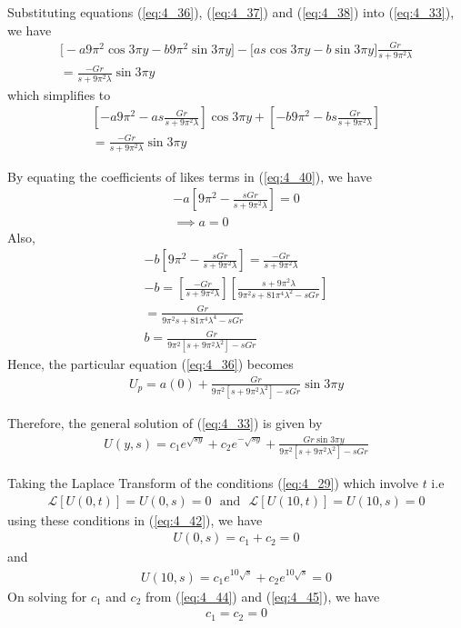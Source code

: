 \documentclass[11pt]{report}
\newcommand{\sps}{\\[0.2cm]}
\newcommand{\refn}[1]{(\ref{#1})}
\newcommand{\refx}[1]{\refn{eq:#1}}
\newcommand{\NI}{\noindent}
\newcommand{\Laplace}{\mathcal{L}}
\newcommand{\sbracket}[1]{\left[#1\right]}
\newcommand{\LFn}[1]{\Laplace \sbracket{#1}}
\newcommand{\Lpt}{Laplace Transform }
\begin{document}
	\NI Substituting equations \refx{4_36}, \refx{4_37} and \refx{4_38} into \refx{4_33}, we have
	\begin{multline}
		\Big[ -a9\pi^2\cos3\pi y - b9\pi^2\sin 3\pi y \Big] - \Big[ as\cos 3\pi y - b\sin 3\pi y \Big]\frac{Gr}{s+9\pi^2 \lambda} \sps= \frac{-Gr}{s+9\pi^2\lambda}\sin 3\pi y
	\end{multline}
	which simplifies to
	\begin{multline}
		\left[-a9\pi^2 - as\frac{Gr}{s+9\pi^2\lambda}\right]\cos3\pi y + \left[-b9\pi^2 - bs\frac{Gr}{s+9\pi^2\lambda}\right] \sps= \frac{-Gr}{s+9\pi^2\lambda}\sin3\pi y\label{eq:4_40}
	\end{multline}

	\NI By equating the coefficients of likes terms in \refx{4_40}, we have
	\begin{gather*}
		-a\left[9\pi^2 - \frac{sGr}{s+9\pi^2\lambda}\right] = 0\sps
		\implies a = 0
	\end{gather*}
	Also,
	\begin{gather*}
		-b\left[9\pi^2 - \frac{sGr}{s+ 9\pi^2\lambda}\right] = \frac{-Gr}{s+9\pi^2\lambda}\sps
		-b = \left[\frac{-Gr}{s+ 9\pi^2\lambda}\right]\left[\frac{s+9\pi^2\lambda}{9\pi^2s + 81\pi^4\lambda^2 - sGr}\right]\sps
		= \frac{Gr}{9\pi^2 s + 81\pi^4\lambda^4 - sGr}\sps
		b = \frac{Gr}{9\pi^2\left[s+9\pi^2\lambda^2\right]-sGr}
	\end{gather*}
	Hence, the particular equation \refx{4_36} becomes
	\begin{eqnarray}
		U_p = a(0) + \frac{Gr}{9\pi^2\left[s+9\pi^2\lambda^2\right]-sGr}\sin3\pi y\label{eq:4_41}
	\end{eqnarray}
	
	\NI Therefore, the general solution of \refx{4_33} is given by
	\begin{eqnarray}
		U(y,s) = c_1e^{\sqrt{sy}} + c_2e^{-\sqrt{sy}} + \frac{Gr\sin3\pi y}{9\pi^2\left[s+9\pi^2\lambda^2\right]-sGr} \label{eq:4_42}
	\end{eqnarray}
	
	\NI Taking the \Lpt of the conditions \refx{4_29} which involve $t$ i.e
	\begin{eqnarray}
		\LFn{U(0,t)} = U(0,s) = 0 \text{ ~and~ } \LFn{U(10,t)} = U(10,s) = 0\label{eq:4_43}
	\end{eqnarray}
	using these conditions in \refx{4_42}, we have
	\begin{eqnarray}
		U(0,s) = c_1 + c_2 = 0\label{eq:4_44}
	\end{eqnarray}
	and
	\begin{eqnarray}
		U(10,s) = c_1e^{10\sqrt{s}} + c_2e^{10\sqrt{s}} = 0\label{eq:4_45}
	\end{eqnarray}
	On solving for $c_1$ and $c_2$ from \refx{4_44} and \refx{4_45}, we have
	\begin{eqnarray}
		c_1 = c_2 = 0\label{eq:4_46}
	\end{eqnarray}
	
\end{document}
